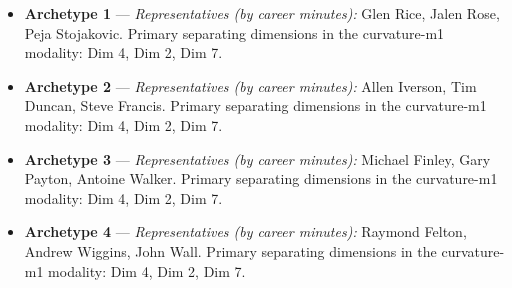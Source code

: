 \begin{itemize}
\item \textbf{Archetype 1} --- \emph{Representatives (by career minutes):} Glen Rice, Jalen Rose, Peja Stojakovic. Primary separating dimensions in the curvature-m1 modality: Dim 4, Dim 2, Dim 7.
\item \textbf{Archetype 2} --- \emph{Representatives (by career minutes):} Allen Iverson, Tim Duncan, Steve Francis. Primary separating dimensions in the curvature-m1 modality: Dim 4, Dim 2, Dim 7.
\item \textbf{Archetype 3} --- \emph{Representatives (by career minutes):} Michael Finley, Gary Payton, Antoine Walker. Primary separating dimensions in the curvature-m1 modality: Dim 4, Dim 2, Dim 7.
\item \textbf{Archetype 4} --- \emph{Representatives (by career minutes):} Raymond Felton, Andrew Wiggins, John Wall. Primary separating dimensions in the curvature-m1 modality: Dim 4, Dim 2, Dim 7.
\end{itemize}
